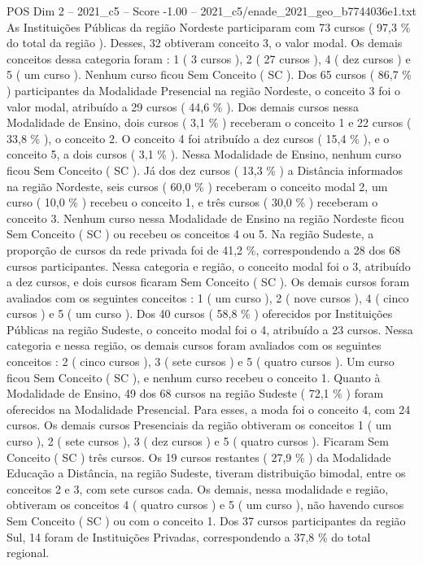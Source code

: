 \begin{textsample}{POS Dim 2 – 2021\_c5 – Score -1.00 – 2021\_c5/enade\_2021\_geo\_b7744036e1.txt}
As Instituições Públicas da região Nordeste participaram com 73 cursos ( 97,3 \% do total da região ).
Desses, 32 obtiveram conceito 3, o valor modal.
Os demais conceitos dessa categoria foram : 1 ( 3 cursos ), 2 ( 27 cursos ), 4 ( dez cursos ) e 5 ( um curso ).
Nenhum curso ficou Sem Conceito ( SC ).
Dos 65 cursos ( 86,7 \% ) participantes da Modalidade Presencial na região Nordeste, o conceito 3 foi o valor modal, atribuído a 29 cursos ( 44,6 \% ).
Dos demais cursos nessa Modalidade de Ensino, dois cursos ( 3,1 \% ) receberam o conceito 1 e 22 cursos ( 33,8 \% ), o conceito 2.
O conceito 4 foi atribuído a dez cursos ( 15,4 \% ), e o conceito 5, a dois cursos ( 3,1 \% ).
Nessa Modalidade de Ensino, nenhum curso ficou Sem Conceito ( SC ).
Já dos dez cursos ( 13,3 \% ) a Distância informados na região Nordeste, seis cursos ( 60,0 \% ) receberam o conceito modal 2, um curso ( 10,0 \% ) recebeu o conceito 1, e três cursos ( 30,0 \% ) receberam o conceito 3.
Nenhum curso nessa Modalidade de Ensino na região Nordeste ficou Sem Conceito ( SC ) ou recebeu os conceitos 4 ou 5.
Na região Sudeste, a proporção de cursos da rede privada foi de 41,2 \%, correspondendo a 28 dos 68 cursos participantes.
Nessa categoria e região, o conceito modal foi o 3, atribuído a dez cursos, e dois cursos ficaram Sem Conceito ( SC ).
Os demais cursos foram avaliados com os seguintes conceitos : 1 ( um curso ), 2 ( nove cursos ), 4 ( cinco cursos ) e 5 ( um curso ).
Dos 40 cursos ( 58,8 \% ) oferecidos por Instituições Públicas na região Sudeste, o conceito modal foi o 4, atribuído a 23 cursos.
Nessa categoria e nessa região, os demais cursos foram avaliados com os seguintes conceitos : 2 ( cinco cursos ), 3 ( sete cursos ) e 5 ( quatro cursos ).
Um curso ficou Sem Conceito ( SC ), e nenhum curso recebeu o conceito 1.
Quanto à Modalidade de Ensino, 49 dos 68 cursos na região Sudeste ( 72,1 \% ) foram oferecidos na Modalidade Presencial.
Para esses, a moda foi o conceito 4, com 24 cursos.
Os demais cursos Presenciais da região obtiveram os conceitos 1 ( um curso ), 2 ( sete cursos ), 3 ( dez cursos ) e 5 ( quatro cursos ).
Ficaram Sem Conceito ( SC ) três cursos.
Os 19 cursos restantes ( 27,9 \% ) da Modalidade Educação a Distância, na região Sudeste, tiveram distribuição bimodal, entre os conceitos 2 e 3, com sete cursos cada.
Os demais, nessa modalidade e região, obtiveram os conceitos 4 ( quatro cursos ) e 5 ( um curso ), não havendo cursos Sem Conceito ( SC ) ou com o conceito 1.
Dos 37 cursos participantes da região Sul, 14 foram de Instituições Privadas, correspondendo a 37,8 \% do total regional.

\end{textsample}
